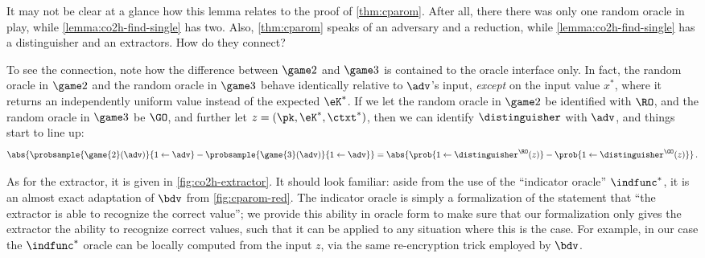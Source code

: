     It may not be clear at a glance how this lemma relates to the proof of
      \cref{thm:cparom}. After all, there there was only one random oracle in
      play, while \cref{lemma:co2h-find-single} has two. Also,
      \cref{thm:cparom} speaks of an adversary and a reduction, while
      \cref{lemma:co2h-find-single} has a distinguisher and an extractors. How
      do they connect?

    To see the connection, note how the difference between $\game 2$ and $\game 3$
      is contained to the oracle interface only. In fact, the random oracle
      in $\game 2$ and the random oracle in $\game 3$ behave identically
      relative to $\adv$'s input,
      \emph{except} on the input value $x^*$, where it returns an independently
      uniform value instead of the expected $\eK^*$. 
      If we let the random oracle in $\game 2$ be identified with $\RO$, and the
      random oracle in $\game 3$ be $\GO$, and further let $z = (\pk, \eK^*,
      \ctxt^*)$, then we can identify $\distinguisher$ with $\adv$, and things
      start to line up:
      \[
        \abs{\probsample{\game{2}(\adv)}{1 \gets \adv}
          - \probsample{\game{3}(\adv)}{1 \gets \adv}}
        = \abs{\prob{1 \gets \distinguisher^{\RO}(z)}
          - \prob{1 \gets \distinguisher^{\GO}(z)}}\, .
      \]

    As for the extractor, it is given in \cref{fig:co2h-extractor}. It should
      look familiar: aside from the use of the ``indicator oracle'' $\indfunc^*$, it is an
      almost exact adaptation of $\bdv$ from \cref{fig:cparom-red}.
      The indicator oracle is simply a formalization of the statement that ``the
      extractor is able to recognize the correct value''; we provide this
      ability in oracle form to make sure that our formalization 
      only gives the extractor the ability to recognize correct values, 
      such that it can be applied to any situation where this is the case. For
      example, in our case the $\indfunc^*$ oracle can be locally computed from
      the input $z$, via the same re-encryption trick employed by $\bdv$.

